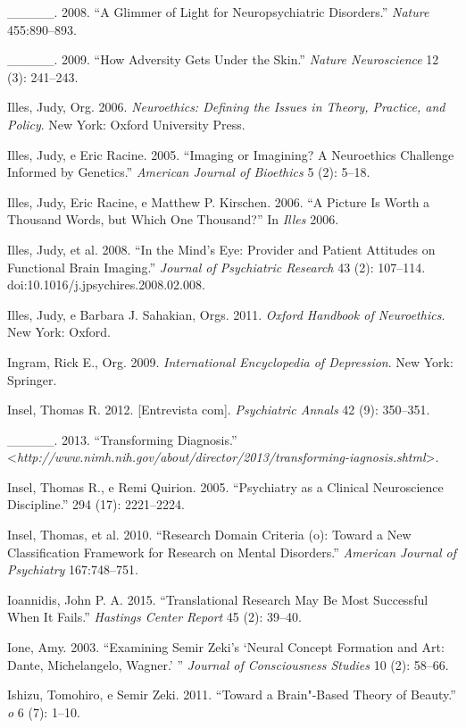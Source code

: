 {\begin{Parskip}
\_\_\_\_\_. 2008. ``A Glimmer of Light for Neuropsychiatric Disorders.''
\emph{Nature} 455:890--893.

\_\_\_\_\_. 2009. ``How Adversity Gets Under the Skin.'' \emph{Nature
Neuroscience} 12 (3): 241--243.

Illes, Judy, Org. 2006. \emph{Neuroethics: Defining the Issues in
Theory, Practice, and Policy}. New York: Oxford University Press.

Illes, Judy, e Eric Racine. 2005. ``Imaging or Imagining? A Neuroethics
Challenge Informed by Genetics.'' \emph{American Journal of Bioethics} 5
(2): 5--18.

Illes, Judy, Eric Racine, e Matthew P. Kirschen. 2006. ``A Picture Is
Worth a Thousand Words, but Which One Thousand?'' In \emph{Illes} 2006.

Illes, Judy, et al. 2008. ``In the Mind's Eye: Provider and Patient
Attitudes on Functional Brain Imaging.'' \emph{Journal of Psychiatric
Research} 43 (2): 107--114. doi:10.1016/j.jpsychires.2008.02.008.

Illes, Judy, e Barbara J. Sahakian, Orgs. 2011. \emph{Oxford Handbook of
Neuroethics}. New York: Oxford.

Ingram, Rick E., Org. 2009. \emph{International Encyclopedia of
Depression}. New York: Springer.

Insel, Thomas R. 2012. {[}Entrevista com{]}. \emph{Psychiatric Annals}
42 (9): 350--351.

\_\_\_\_\_. 2013. ``Transforming Diagnosis.''
\textless{}\emph{http://www.nimh.nih.gov/about/director/2013/transforming-iagnosis.shtml}\textgreater{}.

Insel, Thomas R., e Remi Quirion. 2005. ``Psychiatry as a Clinical
Neuroscience Discipline.'' \emph{} 294 (17): 2221--2224.

Insel, Thomas, et al. 2010. ``Research Domain Criteria (o): Toward a
New Classification Framework for Research on Mental Disorders.''
\emph{American Journal of Psychiatry} 167:748--751.

Ioannidis, John P. A. 2015. ``Translational Research May Be Most
Successful When It Fails.'' \emph{Hastings Center Report} 45 (2):
39--40.

Ione, Amy. 2003. ``Examining Semir Zeki's `Neural Concept Formation and
Art: Dante, Michelangelo, Wagner.' '' \emph{Journal of Consciousness
Studies} 10 (2): 58--66.

Ishizu, Tomohiro, e Semir Zeki. 2011. ``Toward a Brain"-Based Theory of
Beauty.'' \emph{o} 6 (7): 1--10.


\end{Parskip}}
